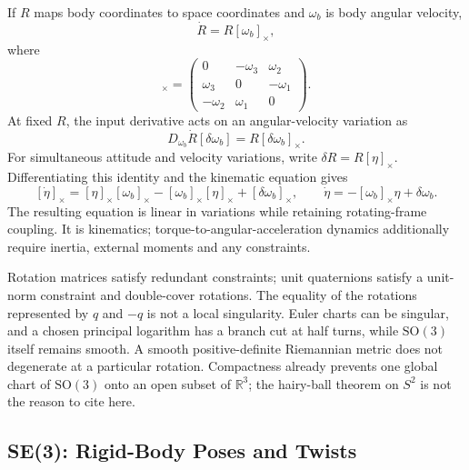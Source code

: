 If $R$ maps body coordinates to space coordinates and $\omega_b$ is body angular velocity,
\begin{equation}
\dot R=R[\omega_b]_\times,
\label{eq:ch1:attitude-kinematics}
\end{equation}
where
\begin{equation}
[\omega]_\times=\begin{pmatrix}0&-\omega_3&\omega_2\\\omega_3&0&-\omega_1\\-\omega_2&\omega_1&0\end{pmatrix}.
\label{eq:ch1:skew-symmetric}
\end{equation}
At fixed $R$, the input derivative acts on an angular-velocity variation as
\begin{equation}
D_{\omega_b}\dot R[\delta\omega_b]=R[\delta\omega_b]_\times.
\label{eq:ch1:attitude-jacobian}
\end{equation}
For simultaneous attitude and velocity variations, write $\delta R=R[\eta]_\times$.
Differentiating this identity and the kinematic equation gives
\[
[\dot\eta]_\times=[\eta]_\times[\omega_b]_\times-[\omega_b]_\times[\eta]_\times
+[\delta\omega_b]_\times,
\qquad \dot\eta=-[\omega_b]_\times\eta+\delta\omega_b.
\]
The resulting equation is linear in variations while retaining rotating-frame coupling.
It is kinematics; torque-to-angular-acceleration dynamics additionally require inertia,
external moments and any constraints.

Rotation matrices satisfy redundant constraints; unit quaternions satisfy a unit-norm
constraint and double-cover rotations. The equality of the rotations represented by $q$
and $-q$ is not a local singularity. Euler charts can be singular, and a chosen principal
logarithm has a branch cut at half turns, while $\mathrm{SO}(3)$ itself remains smooth.
A smooth positive-definite Riemannian metric does not degenerate at a particular rotation.
Compactness already prevents one global chart of $\mathrm{SO}(3)$ onto an open subset
of $\mathbb R^3$; the hairy-ball theorem on $S^2$ is not the reason to cite here.

\subsection{SE(3): Rigid-Body Poses and Twists}

